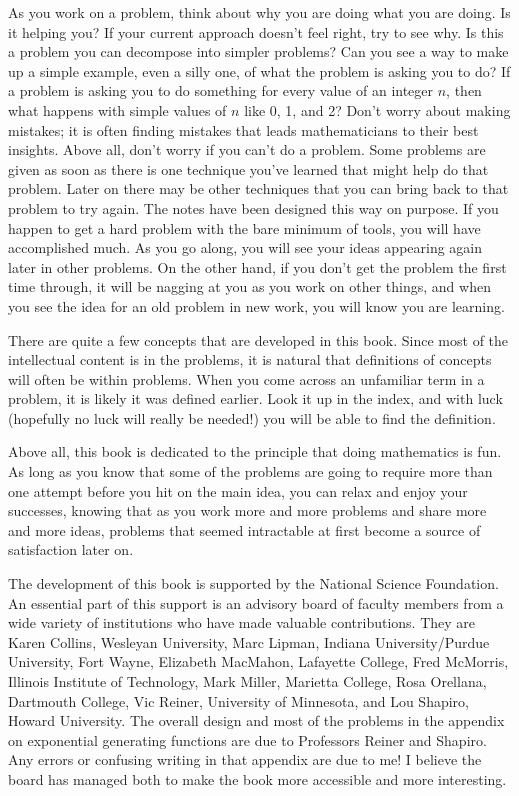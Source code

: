 \documentclass[10pt,]{book}
\theoremstyle{plain}
\theoremstyle{definition}
\theoremstyle{definition}
\numberwithin{equation}{chapter}
\begin{document}
\par
As you work on a problem, think about why you are doing what you are doing. Is it helping you? If your current approach doesn't feel right, try to see why. Is this a problem you can decompose into simpler problems? Can you see a way to make up a simple example, even a silly one, of what the problem is asking you to do? If a problem is asking you to do something for every value of an integer \(n\), then what happens with simple values of \(n\) like 0, 1, and 2? Don't worry about making mistakes; it is often finding mistakes that leads mathematicians to their best insights. Above all, don't worry if you can't do a problem. Some problems are given as soon as there is one technique you've learned that might help do that problem. Later on there may be other techniques that you can bring back to that problem to try again. The notes have been designed this way on purpose. If you happen to get a hard problem with the bare minimum of tools, you will have accomplished much. As you go along, you will see your ideas appearing again later in other problems. On the other hand, if you don't get the problem the first time through, it will be nagging at you as you work on other things, and when you see the idea for an old problem in new work, you will know you are learning.%
\par
There are quite a few concepts that are developed in this book. Since most of the intellectual content is in the problems, it is natural that definitions of concepts will often be within problems. When you come across an unfamiliar term in a problem, it is likely it was defined earlier. Look it up in the index, and with luck (hopefully no luck will really be needed!) you will be able to find the definition.%
\par
Above all, this book is dedicated to the principle that doing mathematics is fun. As long as you know that some of the problems are going to require more than one attempt before you hit on the main idea, you can relax and enjoy your successes, knowing that as you work more and more problems and share more and more ideas, problems that seemed intractable at first become a source of satisfaction later on.%
\par
The development of this book is supported by the National Science Foundation. An essential part of this support is an advisory board of faculty members from a wide variety of institutions who have made valuable contributions. They are Karen Collins, Wesleyan University, Marc Lipman, Indiana University/Purdue University, Fort Wayne, Elizabeth MacMahon, Lafayette College, Fred McMorris, Illinois Institute of Technology, Mark Miller, Marietta College, Rosa Orellana, Dartmouth College, Vic Reiner, University of Minnesota, and Lou Shapiro, Howard University. The overall design and most of the problems in the appendix on exponential generating functions are due to Professors Reiner and Shapiro. Any errors or confusing writing in that appendix are due to me! I believe the board has managed both to make the book more accessible and more interesting.%
\end{document}
